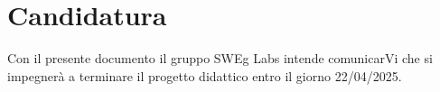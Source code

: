 \section{Candidatura}

Con il presente documento il gruppo SWEg Labs intende comunicarVi che si impegnerà a terminare il progetto didattico entro il giorno 22/04/2025.